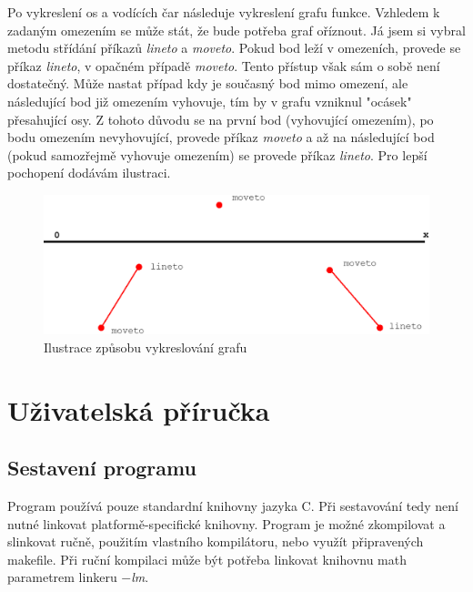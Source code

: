 \documentclass 	[a4paper,12pt]	{article}
\begin{document}
Po vykreslení os a vodících čar následuje vykreslení grafu funkce. Vzhledem k zadaným omezením se může stát, že bude potřeba graf oříznout. Já jsem si vybral metodu střídání příkazů \emph{lineto} a \emph{moveto}. Pokud bod leží v omezeních, provede se příkaz \emph{lineto}, v opačném případě \emph{moveto}. Tento přístup však sám o sobě není dostatečný. Může nastat případ kdy je současný bod mimo omezení, ale následující bod již omezením vyhovuje, tím by v grafu vzniknul "ocásek" přesahující osy. Z tohoto důvodu se na první bod (vyhovující omezením), po bodu omezením nevyhovující, provede příkaz \emph{moveto} a až na následující bod (pokud samozřejmě vyhovuje omezením) se provede příkaz \emph{lineto}. Pro lepší pochopení dodávám ilustraci.\\
\begin{figure}[!htb]
\includegraphics[width=1\linewidth]{ocasek-ilustrace.eps}
\caption{Ilustrace způsobu vykreslování grafu}
\end{figure}

\section{Uživatelská příručka}
\label{sec:uziv_pr}
\subsection{Sestavení programu}
Program používá pouze standardní knihovny jazyka C. Při sestavování tedy není nutné linkovat platformě-specifické knihovny. Program je možné zkompilovat a slinkovat ručně, použitím vlastního kompilátoru, nebo využít připravených makefile. Při ruční kompilaci může být potřeba linkovat knihovnu math parametrem linkeru \emph{$-$lm}.
 
\end{document}
